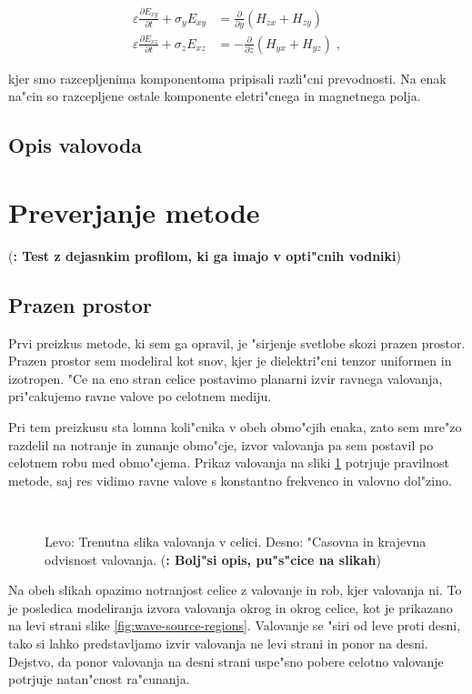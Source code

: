 \documentclass[a4paper,10pt]{article}
\newcommand{\todo}[1]{(\textbf{\textsmaller{TODO}: #1})}
\newcommand{\odvod}[2]{\frac{\partial #1}{\partial #2}}
\newcommand{\eps}{\varepsilon}
\begin{document}
\begin{align}
 \eps \odvod{E_{xy}}{t} + \sigma_y E_{xy} &= \odvod{}{y}(H_{zx} + H_{zy}) \\
 \eps \odvod{E_{xz}}{t} + \sigma_z E_{xz} &= -\odvod{}{z}(H_{yx} + H_{yz})\;,
\end{align}

kjer smo razcepljenima komponentoma pripisali razli"cni prevodnosti. 
Na enak na"cin so razcepljene ostale komponente eletri"cnega in magnetnega polja. 

\subsection{Opis valovoda}



\section{Preverjanje metode}

\todo{Test z dejasnkim profilom, ki ga imajo v opti"cnih vodniki}

\subsection{Prazen prostor}
Prvi preizkus metode, ki sem ga opravil, je "sirjenje svetlobe skozi prazen prostor. 
Prazen prostor sem modeliral kot snov, kjer je dielektri"cni tenzor uniformen in izotropen. 
"Ce na eno stran celice postavimo planarni izvir ravnega valovanja, pri"cakujemo ravne valove po celotnem mediju. 

Pri tem preizkusu sta lomna koli"cnika v obeh obmo"cjih enaka, zato sem mre"zo razdelil na notranje in zunanje obmo"cje, izvor valovanja pa sem postavil po celotnem robu med obmo"cjema. 
Prikaz valovanja na sliki \ref{fig:test-plane} potrjuje pravilnost metode, saj res vidimo ravne valove s konstantno frekvenco in valovno dol"zino. 

\begin{figure}[h]
 \centering
  \,
\caption{Levo: Trenutna slika valovanja v celici. Desno: "Casovna in krajevna odvisnost valovanja. \todo{Bolj"si opis, pu"s"cice na slikah}}
\label{fig:test-plane}
\end{figure}

Na obeh slikah opazimo notranjost celice z valovanje in rob, kjer valovanja ni.
To je posledica modeliranja izvora valovanja okrog in okrog celice, kot je prikazano na levi strani slike \ref{fig:wave-source-regions}.
Valovanje se "siri od leve proti desni, tako si lahko predstavljamo izvir valovanja ne levi strani in ponor na desni. 
Dejstvo, da ponor valovanja na desni strani uspe"sno pobere celotno valovanje potrjuje natan"cnost ra"cunanja. 
\end{document}
